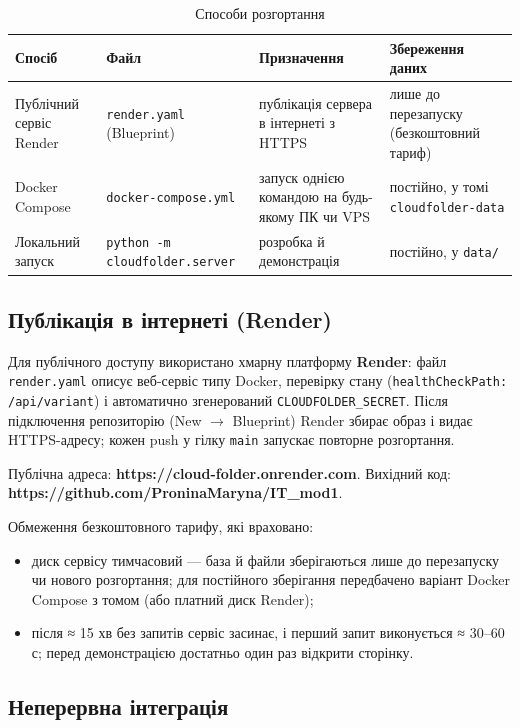 \documentclass[12pt,a4paper]{article}
\begin{document}
{\small
\begin{longtable}{@{}p{3.4cm}p{3.8cm}p{5.0cm}p{4.0cm}@{}}
\caption{Способи розгортання}\\
\toprule
\textbf{Спосіб} & \textbf{Файл} & \textbf{Призначення} & \textbf{Збереження даних} \\
\midrule
\endhead
Публічний сервіс Render & \texttt{render.yaml} (Blueprint) & публікація сервера в інтернеті з HTTPS & лише до перезапуску (безкоштовний тариф) \\ \midrule
Docker Compose & \texttt{docker-compose.yml} & запуск однією командою на будь-якому ПК чи VPS & постійно, у томі \texttt{cloudfolder-data} \\ \midrule
Локальний запуск & \texttt{python -m cloudfolder.server} & розробка й демонстрація & постійно, у \texttt{data/\allowbreak{}} \\ \midrule
\bottomrule
\end{longtable}}

\subsection{Публікація в інтернеті (Render)}

Для публічного доступу використано хмарну платформу \textbf{Render}: файл \texttt{render.yaml} описує веб-сервіс типу Docker, перевірку стану (\texttt{healthCheckPath: /\allowbreak{}api/\allowbreak{}variant}) і автоматично згенерований \texttt{CLOUDFOLDER\_SECRET}. Після підключення репозиторію (New $\to$ Blueprint) Render збирає образ і видає HTTPS-адресу; кожен push у гілку \texttt{main} запускає повторне розгортання.

Публічна адреса: \textbf{https://cloud-folder.onrender.com}. Вихідний код: \textbf{https://github.com/ProninaMaryna/IT\_mod1}.

Обмеження безкоштовного тарифу, які враховано:

\begin{itemize}[nosep]
    \item диск сервісу тимчасовий --- база й файли зберігаються лише до перезапуску чи нового розгортання; для постійного зберігання передбачено варіант Docker Compose з томом (або платний диск Render);
    \item після ≈ 15 хв без запитів сервіс засинає, і перший запит виконується ≈ 30--60 с; перед демонстрацією достатньо один раз відкрити сторінку.
\end{itemize}

\subsection{Неперервна інтеграція}
\end{document}
